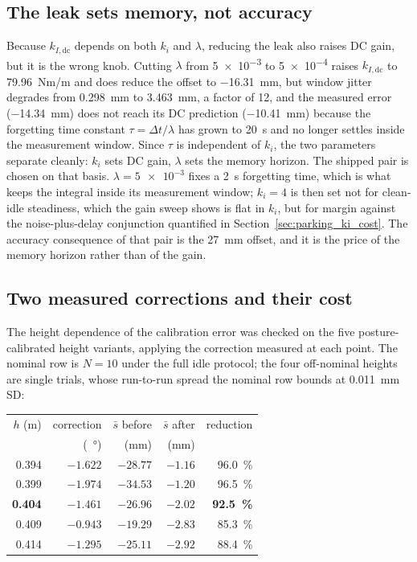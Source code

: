 \documentclass[a4paper,fleqn]{cas-dc}
\begin{document}
\subsection{The leak sets memory, not accuracy}

Because $k_{I,\text{dc}}$ depends on both $k_i$ and $\lambda$, reducing the leak also raises DC gain, but it is the wrong knob. Cutting
$\lambda$ from \num{5e-3} to \num{5e-4} raises $k_{I,\text{dc}}$ to
\SI{79.96}{Nm/m} and does reduce the offset to \SI{-16.31}{mm}, but window
jitter degrades from \SI{0.298}{mm} to \SI{3.463}{mm}, a factor of \num{12},
and the measured error (\SI{-14.34}{mm}) does not reach its DC prediction
(\SI{-10.41}{mm}) because the forgetting time constant
$\tau{=}\Delta t/\lambda$ has grown to \SI{20}{s} and no longer settles inside
the measurement window. Since $\tau$ is independent of $k_i$, the two
parameters separate cleanly: $k_i$ sets DC gain, $\lambda$ sets the memory
horizon. The shipped pair is chosen on that basis. $\lambda{=}\num{5e-3}$ fixes
a \SI{2}{s} forgetting time, which is what keeps the integral inside its
measurement window; $k_i{=}\num{4}$ is then set not for clean-idle steadiness,
which the gain sweep shows is flat in $k_i$, but for margin against the
noise-plus-delay conjunction quantified in Section~\ref{sec:parking_ki_cost}. The
accuracy consequence of that pair is the \SI{27}{mm} offset, and it is the price
of the memory horizon rather than of the gain.

\subsection{Two measured corrections and their cost}

The height dependence of the calibration error was checked on the five
posture-calibrated height variants, applying the correction measured at each
point. The nominal row is $N{=}10$ under the full idle protocol; the four
off-nominal heights are single trials, whose run-to-run spread the nominal
row bounds at \SI{0.011}{mm} SD:

\begin{center}\footnotesize
\begin{tabular}{rrrrr}
\hline
$h$ (m) & correction & $\bar{s}$ before & $\bar{s}$ after & reduction \\
 & (\SI{}{\degree}) & (mm) & (mm) & \\
\hline
0.394 & $-1.622$ & $-28.77$ & $-1.16$ & \SI{96.0}{\percent} \\
0.399 & $-1.974$ & $-34.53$ & $-1.20$ & \SI{96.5}{\percent} \\
\textbf{0.404} & $\mathbf{-1.461}$ & $\mathbf{-26.96}$ & $\mathbf{-2.02}$ & \textbf{\SI{92.5}{\percent}} \\
0.409 & $-0.943$ & $-19.29$ & $-2.83$ & \SI{85.3}{\percent} \\
0.414 & $-1.295$ & $-25.11$ & $-2.92$ & \SI{88.4}{\percent} \\
\hline
\end{tabular}
\end{center}
\end{document}
